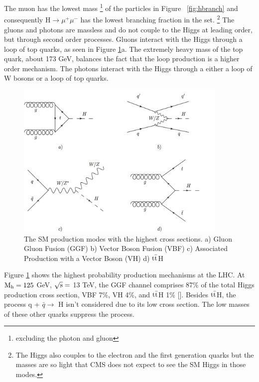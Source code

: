 The muon has the lowest mass \footnote{excluding the photon and gluon} of the particles in Figure ~\ref{fig:hbranch} and consequently H$\rightarrow \mu^{+}\mu^{-}$ has the lowest branching fraction in the set. \footnote{The Higgs also couples to the electron and the first generation quarks but the masses are so light that CMS does not expect to see the SM Higgs in those modes.} The gluons and photons are massless and do not couple to the Higgs at leading order, but through second order processes. Gluons interact with the Higgs through a loop of top quarks, as seen in Figure \ref{fig:hfeynprod}a. The extremely heavy mass of the top quark, about 173 GeV, balances the fact that the loop production is a higher order mechanism. The photons interact with the Higgs through a either a loop of W bosons or a loop of top quarks. 
\begin{figure}[h!]
  \centering
  \includegraphics[width=4in]{images/higgs_production_modes.png}
  \caption
   {The SM production modes with the highest cross sections. a) Gluon Gluon Fusion (GGF) b) Vector Boson Fusion (VBF) c) Associated Production with a Vector Boson (VH) d) ${\rm t\bar{t}}$H}
  \label{fig:hfeynprod}
\end{figure}
Figure \ref{fig:hfeynprod} shows the highest probability production mechanisms at the LHC. At ${\rm M_{h} = 125}$ GeV, ${\rm \sqrt{s} =}$ 13 TeV, the GGF channel comprises 87\% of the total Higgs production cross section, VBF 7\%, VH 4\%, and ${\rm t\bar{t}}$H 1\% [\cite{crossbranchplots}]. Besides ${\rm t\bar{t}}$H, the process q + $\bar{q} \rightarrow$ H isn't considered due to its low cross section. The low masses of these other quarks suppress the process. 

